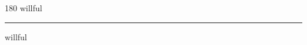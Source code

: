 
\begin{frame}
\begin{center}
\begin{turn}{180}
{\fontsize{2.5cm}{1em}\selectfont willful}
\end{turn}
\vspace{1em}\par  
\hrule
\vspace{1em}\par  
{\fontsize{2.5cm}{1em}\selectfont willful}
\end{center}
\end{frame}
